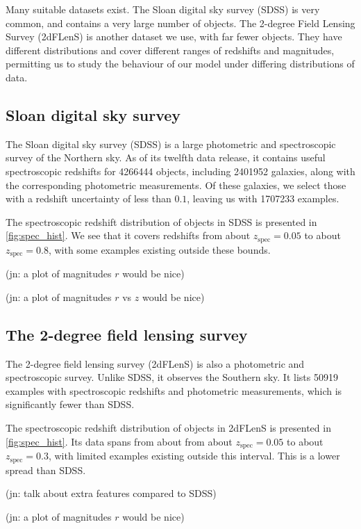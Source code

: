 \documentclass[11pt,twoside,openright]{report}
\newcommand\jn[1]{{\color{red}(jn: #1)}}
\begin{document}
  Many suitable datasets exist. The Sloan digital sky survey (SDSS) is very common, and contains a very large number of objects. The 2-degree Field Lensing Survey (2dFLenS) is another dataset we use, with far fewer objects. They have different distributions and cover different ranges of redshifts and magnitudes, permitting us to study the behaviour of our model under differing distributions of data.

  \subsection{Sloan digital sky survey}
  The Sloan digital sky survey (SDSS) is a large photometric and spectroscopic survey of the Northern sky. As of its twelfth data release, it contains useful spectroscopic redshifts for \SI{4266444}{} objects, including \SI{2401952}{} galaxies, along with the corresponding photometric measurements. \citep{SDSS} Of these galaxies, we select those with a redshift uncertainty of less than $0.1$, leaving us with \SI{1707233}{} examples.

  The spectroscopic redshift distribution of objects in SDSS is presented in \cref{fig:spec_hist}. We see that it covers redshifts from about $z_\mathrm{spec} = 0.05$ to about $z_\mathrm{spec} = 0.8$, with some examples existing outside these bounds.

  \jn{a plot of magnitudes $r$ would be nice}

  \jn{a plot of magnitudes $r$ vs $z$ would be nice}

  \subsection{The 2-degree field lensing survey}
  The 2-degree field lensing survey (2dFLenS) is also a photometric and spectroscopic survey. Unlike SDSS, it observes the Southern sky. It lists \SI{50919}{} examples with spectroscopic redshifts and photometric measurements, which is significantly fewer than SDSS.

  The spectroscopic redshift distribution of objects in 2dFLenS is presented in \cref{fig:spec_hist}. Its data spans from about from about $z_\mathrm{spec} = 0.05$ to about $z_\mathrm{spec} = 0.3$, with limited examples existing outside this interval. This is a lower spread than SDSS.

  \jn{talk about extra features compared to SDSS}

  \jn{a plot of magnitudes $r$ would be nice}
\end{document}
